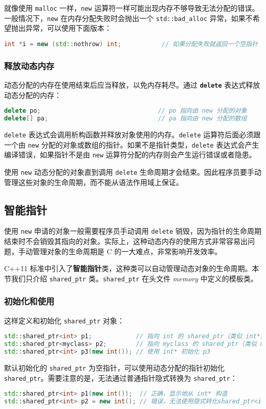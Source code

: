 \documentclass[hyperref,UTF8]{article}
\begin{document}
就像使用 \texttt{malloc} 一样，\texttt{new} 运算符一样可能出现内存不够导致无法分配的错误。一般情况下，\texttt{new} 在内存分配失败时会抛出一个 \texttt{std::bad\_alloc} 异常，如果不希望抛出异常，可以使用下面版本：
\begin{lstlisting}[language=c++,numbers=none]
int *i = new (std::nothrow) int;           // 如果分配失败就返回一个空指针
\end{lstlisting}

\subsubsection{释放动态内存}

动态分配的内存在使用结束后应当释放，以免内存耗尽。通过 \textbf{\texttt{delete}} 表达式释放动态分配的内存：
\begin{lstlisting}[language=c++,numbers=none]
delete po;                                // po 指向由 new 分配的对象
delete[] pa;                              // pa 指向由 new 分配的数组
\end{lstlisting}
\texttt{delete} 表达式会调用析构函数并释放对象使用的内存。\texttt{delete} 运算符后面必须跟一个由 \texttt{new} 分配的对象或数组的指针。如果不是指针类型，\texttt{delete} 表达式会产生编译错误，如果指针不是由 \texttt{new} 运算符分配的内存则会产生运行错误或者隐患。

使用 \texttt{new} 动态分配的对象直到调用 \texttt{delete} 生命周期才会结束。因此程序员要手动管理这些对象的生命周期，而不能从语法作用域上保证。

\subsection{智能指针}

使用 \texttt{new} 申请的对象一般需要程序员手动调用 \texttt{delete} 销毁，因为指针的生命周期结束时不会销毁其指向的对象。实际上，这种动态内存的使用方式非常容易出问题，手动管理对象的生命周期是 C 的一大难点，非常影响开发效率。

C++11 标准中引入了\textbf{智能指针}类，这种类可以自动管理动态对象的生命周期。本节我们只介绍 \texttt{shared\_ptr} 类。\texttt{shared\_ptr} 在头文件 \textsl{memory} 中定义的模板类。

\subsubsection{初始化和使用}

这样定义和初始化 \texttt{shared\_ptr} 对象：
\begin{lstlisting}[language=c++]
std::shared_ptr<int> p1;            // 指向 int 的 shared_ptr（类似 int*）
std::shared_ptr<myclass> p2;        // 指向 myclass 的 shared_ptr（类似 myclass*）
std::shared_ptr<int> p3(new int()); // 使用 int* 初始化 p3
\end{lstlisting}
默认初始化的 \texttt{shared\_ptr} 为空指针，可以使用动态分配的指针初始化 \texttt{shared\_ptr}。需要注意的是，无法通过普通指针隐式转换为 \texttt{shared\_ptr}：
\begin{lstlisting}[language=c++]
std::shared_ptr<int> p1(new int());  // 正确，显示地从 int* 构造 
std::shared_ptr<int> p2 = new int(); // 错误，无法使用隐式转化shared_ptr<int>
\end{lstlisting}
\end{document}
